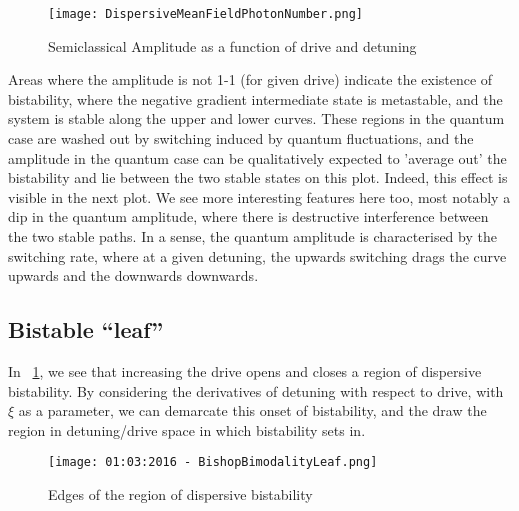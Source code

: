 \begin{figure}
        \label{SemiclassicalBistability}
        \texttt{[image: DispersiveMeanFieldPhotonNumber.png]}
        \caption{Semiclassical Amplitude as a function of drive and detuning}
\end{figure}
Areas where the amplitude is not 1-1 (for given drive) indicate the existence of bistability, where the negative gradient intermediate state is metastable, and the system is stable along the upper and lower curves. These regions in the quantum case are washed out by switching induced by quantum fluctuations, and the amplitude in the quantum case can be qualitatively expected to 'average out' the bistability and lie between the two stable states on this plot. Indeed, this effect is visible in the next plot. We see more interesting features here too, most notably a dip in the quantum amplitude, where there is destructive interference between the two stable paths. In a sense, the quantum amplitude is characterised by the switching rate, where at a given detuning, the upwards switching drags the curve upwards and the downwards downwards.
\subsection{Bistable ``leaf''}
In ~\ref{SemiclassicalBistability}, we see that increasing the drive opens and closes a region of dispersive bistability. By considering the derivatives of detuning with respect to drive, with $\xi$ as a parameter, we can demarcate this onset of bistability, and the draw the region in detuning/drive space in which bistability sets in.
\begin{figure}
        \label{BistabilityLeaf}
        \texttt{[image: 01:03:2016 - BishopBimodalityLeaf.png]}
        \caption{Edges of the region of dispersive bistability}
\end{figure}

